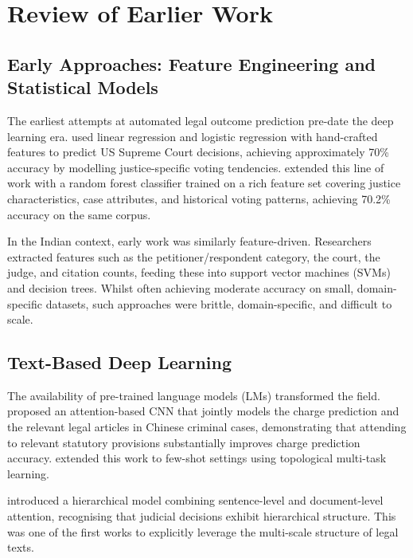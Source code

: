 \documentclass[12pt,a4paper]{report}
\begin{document}
\chapter{Review of Earlier Work}
\label{chap:related_work}

\section{Early Approaches: Feature Engineering and Statistical Models}

The earliest attempts at automated legal outcome prediction pre-date the deep learning era. \citet{lauderdale2012supreme} used linear regression and logistic regression with hand-crafted features to predict US Supreme Court decisions, achieving approximately 70\% accuracy by modelling justice-specific voting tendencies. \citet{katz2017general} extended this line of work with a random forest classifier trained on a rich feature set covering justice characteristics, case attributes, and historical voting patterns, achieving 70.2\% accuracy on the same corpus.

In the Indian context, early work was similarly feature-driven. Researchers extracted features such as the petitioner/respondent category, the court, the judge, and citation counts, feeding these into support vector machines (SVMs) and decision trees. Whilst often achieving moderate accuracy on small, domain-specific datasets, such approaches were brittle, domain-specific, and difficult to scale.

\section{Text-Based Deep Learning}

The availability of pre-trained language models (LMs) transformed the field. \citet{luo2017attention} proposed an attention-based CNN that jointly models the charge prediction and the relevant legal articles in Chinese criminal cases, demonstrating that attending to relevant statutory provisions substantially improves charge prediction accuracy. \citet{hu2018few} extended this work to few-shot settings using topological multi-task learning.

\citet{yang2019legal} introduced a hierarchical model combining sentence-level and document-level attention, recognising that judicial decisions exhibit hierarchical structure. This was one of the first works to explicitly leverage the multi-scale structure of legal texts.
\end{document}
